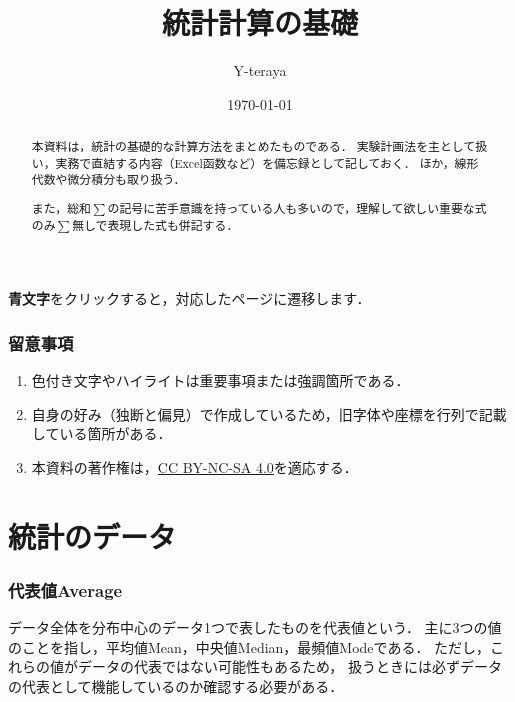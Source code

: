 \documentclass[a4paper,11pt]{ltjsarticle}
\title{\textbf{統計計算の基礎}}
\author{Y-teraya}
\date{\today}
\numberwithin{equation}{section}
\renewcommand{\cite}[1]{\textsuperscript{\citep{#1}}}
\begin{document}
\maketitle

\begin{abstract}
  本資料は，統計の基礎的な計算方法をまとめたものである．
  実験計画法を主として扱い，実務で直結する内容（Excel函数など）を備忘録として記しておく．
  ほか，線形代数や微分積分も取り扱う．

  また，総和$\sum$の記号に苦手意識を持っている人も多いので，理解して欲しい重要な式のみ$\sum$無しで表現した式も併記する．
\end{abstract}

\tableofcontents

\vspace{12pt}

\begin{center}
  \textbf{\color{blue}青文字}をクリックすると，対応したページに遷移します．
\end{center}

\section*{留意事項}

\begin{enumerate}
  \item 色付き文字やハイライトは重要事項または強調箇所である．
  \item 自身の好み（独断と偏見）で作成しているため，旧字体や座標を行列で記載している箇所がある．
  \item 本資料の著作権は，\href{https://creativecommons.org/licenses/by-nc-sa/4.0}{CC BY-NC-SA 4.0}を適応する．
\end{enumerate}

\clearpage

\part{統計のデータ}
\label{part: statistics}

\section{代表値Average}
\label{sec: average}

データ全体を分布中心のデータ1つで表したものを代表値という．
主に3つの値のことを指し，平均値Mean，中央値Median，最頻値Modeである．
ただし，これらの値がデータの代表ではない可能性もあるため，
扱うときには必ずデータの代表として機能しているのか確認する必要がある\cite{ave-1, ave-2}．
\end{document}

